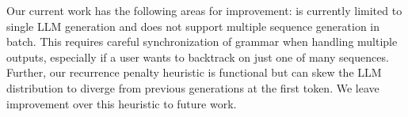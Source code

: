 Our current work has the following areas for improvement:
\Tool{} is currently limited to single LLM generation and does not support multiple sequence generation in batch. 
This requires careful synchronization of grammar when handling multiple outputs, especially if a user wants to backtrack on just one of many sequences.
Further, our recurrence penalty heuristic is functional but can skew the LLM distribution to diverge from previous generations at the first token. 
We leave improvement over this heuristic to future work. 
%
